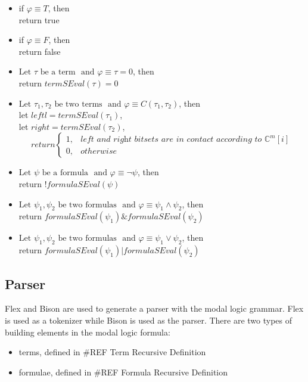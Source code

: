 \documentclass{article}
\begin{document}
		\begin{itemize}
			\item if $\varphi \equiv T$, then \\
				return true
			\item if $\varphi \equiv F$, then \\
				return false
			\item $\text{Let } \tau \text{ be a term } \text{ and } \varphi \equiv \tau = 0$, then \\
				return $termSEval(\tau) = 0$
			\item $\text{Let } \tau_1, \tau_2 \text{ be two terms } \text{ and }  \varphi \equiv C(\tau_1, \tau_2)$, then \\
				let  $leftl = termSEval(\tau_1)$, \\
				let  $right = termSEval(\tau_2)$, \\
\[return  \begin{cases} 
      1, & \textit{left and right bitsets are in contact according to } \mathbb{C}^m[i] \\
      0, & otherwise
   \end{cases}
\]
			\item $\text{Let } \psi \text{ be a formula } \text{ and } \varphi \equiv \neg{\psi}$, then \\
				return $!formulaSEval(\psi)$
			\item $\text{Let } \psi_1, \psi_2 \text{ be two formulas } \text{ and } \varphi \equiv \psi_1 \wedge \psi_2$, then \\
				return $formulaSEval(\psi_1) \& formulaSEval(\psi_2)$
			\item $\text{Let } \psi_1, \psi_2 \text{ be two formulas } \text{ and } \varphi \equiv \psi_1 \vee \psi_2$, then \\
				return $formulaSEval(\psi_1) | formulaSEval(\psi_2)$
		\end{itemize}
	\newpage
	\subsection{Parser}
		Flex and Bison are used to generate a parser with the modal logic grammar.
		Flex is used as a tokenizer while Bison is used as the parser.
		\newline
		There are two types of building elements in the modal logic formula:
		\begin{itemize}
			\item terms, defined in \#REF Term Recursive Definition
			\item formulae, defined in \#REF Formula Recursive Definition
		\end{itemize}
		
\end{document}
